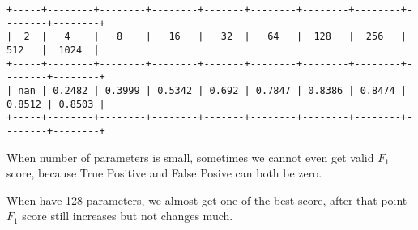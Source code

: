 \documentclass[11pt]{article}
\begin{document}
    \begin{Verbatim}[commandchars=\\\{\}]
+-----+--------+--------+--------+-------+--------+--------+--------+--------+--------+
|  2  |   4    |   8    |   16   |   32  |   64   |  128   |  256   |  512   |  1024  |
+-----+--------+--------+--------+-------+--------+--------+--------+--------+--------+
| nan | 0.2482 | 0.3999 | 0.5342 | 0.692 | 0.7847 | 0.8386 | 0.8474 | 0.8512 | 0.8503 |
+-----+--------+--------+--------+-------+--------+--------+--------+--------+--------+

    \end{Verbatim}

    When number of parameters is small, sometimes we cannot even get valid
\(F_{1}\) score, because True Positive and False Posive can both be
zero.

When have 128 parameters, we almost get one of the best score, after
that point \(F_{1}\) score still increases but not changes much.


    
    
    
    
\end{document}
